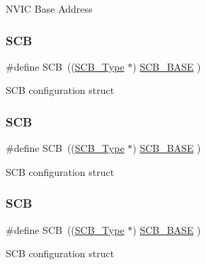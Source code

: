 N\+V\+IC Base Address \mbox{\label{group___c_m_s_i_s__core__base_gaaaf6477c2bde2f00f99e3c2fd1060b01}} 
\subsubsection{\texorpdfstring{SCB}{SCB}\hspace{0.1cm}{\footnotesize\ttfamily [1/12]}}
{\footnotesize\ttfamily \#define S\+CB~((\mbox{\hyperlink{struct_s_c_b___type}{S\+C\+B\+\_\+\+Type}}       $\ast$)     \mbox{\hyperlink{group___c_m_s_i_s__core__base_gad55a7ddb8d4b2398b0c1cfec76c0d9fd}{S\+C\+B\+\_\+\+B\+A\+SE}}      )}

S\+CB configuration struct \mbox{\label{group___c_m_s_i_s__core__base_gaaaf6477c2bde2f00f99e3c2fd1060b01}} 
\subsubsection{\texorpdfstring{SCB}{SCB}\hspace{0.1cm}{\footnotesize\ttfamily [2/12]}}
{\footnotesize\ttfamily \#define S\+CB~((\mbox{\hyperlink{struct_s_c_b___type}{S\+C\+B\+\_\+\+Type}}       $\ast$)     \mbox{\hyperlink{group___c_m_s_i_s__core__base_gad55a7ddb8d4b2398b0c1cfec76c0d9fd}{S\+C\+B\+\_\+\+B\+A\+SE}}      )}

S\+CB configuration struct \mbox{\label{group___c_m_s_i_s__core__base_gaaaf6477c2bde2f00f99e3c2fd1060b01}} 
\subsubsection{\texorpdfstring{SCB}{SCB}\hspace{0.1cm}{\footnotesize\ttfamily [3/12]}}
{\footnotesize\ttfamily \#define S\+CB~((\mbox{\hyperlink{struct_s_c_b___type}{S\+C\+B\+\_\+\+Type}}       $\ast$)     \mbox{\hyperlink{group___c_m_s_i_s__core__base_gad55a7ddb8d4b2398b0c1cfec76c0d9fd}{S\+C\+B\+\_\+\+B\+A\+SE}}      )}

S\+CB configuration struct \mbox{\label{group___c_m_s_i_s__core__base_gaaaf6477c2bde2f00f99e3c2fd1060b01}} 
